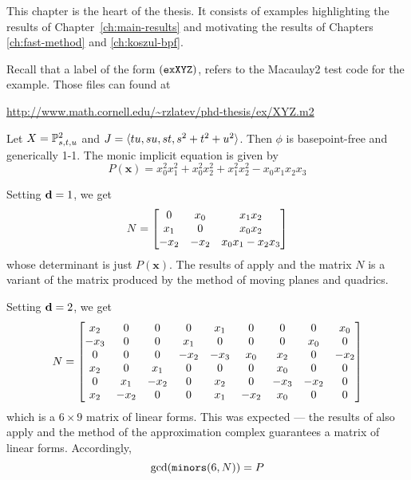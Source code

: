 \documentclass[fleqn,reqno]{amsart}
\newcounter{chapter}
\numberwithin{first}{chapter}
\begin{document}



\begin{paragraf*}
This chapter is the heart of the thesis.
It consists of examples highlighting the results of Chapter~\ref{ch:main-results}
and motivating the results of Chapters \ref{ch:fast-method} and \ref{ch:koszul-bpf}.

Recall that a label of the form $(\mathop{\tt exXYZ})$, refers to the Macaulay2 test code for the example.
Those files can found at
\begin{center}
\url{http://www.math.cornell.edu/~rzlatev/phd-thesis/ex/XYZ.m2}
\end{center}
\end{paragraf*}

\begin{example}[$\mt{ex301}$]
\label{ex301}
Let $X=\mathbb{P}^2_{s,t,u}$ and $J=\langle tu,su,st,s^2+t^2+u^2\rangle$.
Then $\phi$ is basepoint-free and generically 1-1.
The monic implicit equation is given by
\[
	P(\mathbf x)={x}_{0}^{2} {x}_{1}^{2}+{x}_{0}^{2} {x}_{2}^{2}+{x}_{1}^{2}
	{x}_{2}^{2}-{x}_{0} {x}_{1} {x}_{2} {x}_{3}
\]

Setting $\mathbf d=1$, we get
\[
	N=
	\bgroup\begin{bmatrix}0&
      {x}_{0}&
      {x}_{1} {x}_{2}\\
      {x}_{1}&
      0&
      {x}_{0} {x}_{2}\\
      {-{x}_{2}}&
      {-{x}_{2}}&
      {x}_{0} {x}_{1}-{x}_{2} {x}_{3}\\
      \end{bmatrix}\egroup
\]
whose determinant is just $P(\mathbf x)$.
The results of \citet{CGZ-00} apply and the matrix $N$ is a variant of the matrix
produced by the method of moving planes and quadrics.

Setting $\mathbf d=2$, we get
\[
	N=
	\bgroup\begin{bmatrix}{x}_{2}&
	      0&
	      0&
	      0&
	      {x}_{1}&
	      0&
	      0&
	      0&
	      {x}_{0}\\
	      {-{x}_{3}}&
	      0&
	      0&
	      {x}_{1}&
	      0&
	      0&
	      0&
	      {x}_{0}&
	      0\\
	      0&
	      0&
	      0&
	      {-{x}_{2}}&
	      {-{x}_{3}}&
	      {x}_{0}&
	      {x}_{2}&
	      0&
	      {-{x}_{2}}\\
	      {x}_{2}&
	      0&
	      {x}_{1}&
	      0&
	      0&
	      0&
	      {x}_{0}&
	      0&
	      0\\
	      0&
	      {x}_{1}&
	      {-{x}_{2}}&
	      0&
	      {x}_{2}&
	      0&
	      {-{x}_{3}}&
	      {-{x}_{2}}&
	      0\\
	      {x}_{2}&
	      {-{x}_{2}}&
	      0&
	      0&
	      {x}_{1}&
	      {-{x}_{2}}&
	      {x}_{0}&
	      0&
	      0\\
	      \end{bmatrix}\egroup
\]
which is a $6\times9$ matrix of linear forms.
This was expected --- the results of \cite{BJ-03} also apply and the method
of the approximation complex guarantees a matrix of linear forms.
Accordingly,
\[
	\gcd(\mathop{\tt minors}(6,N))=P
\]


\end{example}
\end{document}
